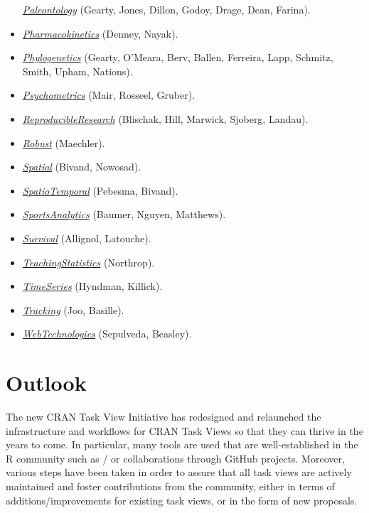 \begin{itemize}
  \href{https://CRAN.R-project.org/view=Paleontology}{\emph{Paleontology}} (Gearty, Jones, Dillon, Godoy, Drage, Dean, Farina).
\item
  \href{https://CRAN.R-project.org/view=Pharmacokinetics}{\emph{Pharmacokinetics}} (Denney, Nayak).
\item
  \href{https://CRAN.R-project.org/view=Phylogenetics}{\emph{Phylogenetics}} (Gearty, O'Meara, Berv, Ballen, Ferreira, Lapp, Schmitz, Smith, Upham, Nations).
\item
  \href{https://CRAN.R-project.org/view=Psychometrics}{\emph{Psychometrics}} (Mair, Rosseel, Gruber).
\item
  \href{https://CRAN.R-project.org/view=ReproducibleResearch}{\emph{ReproducibleResearch}} (Blischak, Hill, Marwick, Sjoberg, Landau).
\item
  \href{https://CRAN.R-project.org/view=Robust}{\emph{Robust}} (Maechler).
\item
  \href{https://CRAN.R-project.org/view=Spatial}{\emph{Spatial}} (Bivand, Nowosad).
\item
  \href{https://CRAN.R-project.org/view=SpatioTemporal}{\emph{SpatioTemporal}} (Pebesma, Bivand).
\item
  \href{https://CRAN.R-project.org/view=SportsAnalytics}{\emph{SportsAnalytics}} (Baumer, Nguyen, Matthews).
\item
  \href{https://CRAN.R-project.org/view=Survival}{\emph{Survival}} (Allignol, Latouche).
\item
  \href{https://CRAN.R-project.org/view=TeachingStatistics}{\emph{TeachingStatistics}} (Northrop).
\item
  \href{https://CRAN.R-project.org/view=TimeSeries}{\emph{TimeSeries}} (Hyndman, Killick).
\item
  \href{https://CRAN.R-project.org/view=Tracking}{\emph{Tracking}} (Joo, Basille).
\item
  \href{https://CRAN.R-project.org/view=WebTechnologies}{\emph{WebTechnologies}} (Sepulveda, Beasley).
\end{itemize}

\section{Outlook}\label{outlook}

The new CRAN Task View Initiative has redesigned and relaunched the infrastructure
and workflows for CRAN Task Views so that they can thrive in the years to come. In particular,
many tools are used that are well-established in the R community such as /
or collaborations through GitHub projects. Moreover, various steps have been taken in
order to assure that all task views are actively maintained and foster contributions
from the community, either in terms of additions/improvements for existing task views,
or in the form of new proposals.

